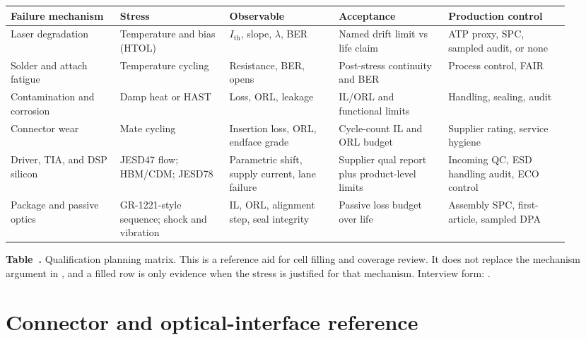 \begin{table}[ht]
\label{tab:qual-planning-matrix}%
\centering
\setlength{\tabcolsep}{3pt}%
\footnotesize
\renewcommand{\arraystretch}{1.15}%
\begin{tabular}{@{}p{0.18\linewidth}p{0.18\linewidth}p{0.18\linewidth}p{0.18\linewidth}p{0.20\linewidth}@{}}
\toprule
Failure mechanism & Stress & Observable & Acceptance & Production control \\
\midrule
Laser degradation & Temperature and bias (HTOL) & $I_\mathrm{th}$, slope, $\lambda$, BER & Named drift limit vs life claim & ATP proxy, SPC, sampled audit, or none \\
\addlinespace[0.7em]
Solder and attach fatigue & Temperature cycling & Resistance, BER, opens & Post-stress continuity and BER & Process control, FAIR \\
\addlinespace[0.7em]
Contamination and corrosion & Damp heat or HAST & Loss, ORL, leakage & IL/ORL and functional limits & Handling, sealing, audit \\
\addlinespace[0.7em]
Connector wear & Mate cycling & Insertion loss, ORL, endface grade & Cycle-count IL and ORL budget & Supplier rating, service hygiene \\
\addlinespace[0.7em]
Driver, TIA, and DSP silicon & JESD47 flow; HBM/CDM; JESD78 & Parametric shift, supply current, lane failure & Supplier qual report plus product-level limits & Incoming QC, ESD handling audit, ECO control \\
\addlinespace[0.7em]
Package and passive optics & GR-1221-style sequence; shock and vibration & IL, ORL, alignment step, seal integrity & Passive loss budget over life & Assembly SPC, first-article, sampled DPA \\
\bottomrule
\end{tabular}
\par\medskip
{\raggedright\footnotesize\textbf{Table~\thetable.} Qualification planning
matrix. This is a reference aid for cell filling and coverage review. It does
not replace the mechanism argument in , and a filled
row is only evidence when the stress is justified for that mechanism.
Interview form: .\par}
\end{table}
\FloatBarrier

\section{Connector and optical-interface reference}
\label{sec:connector-reliability}

